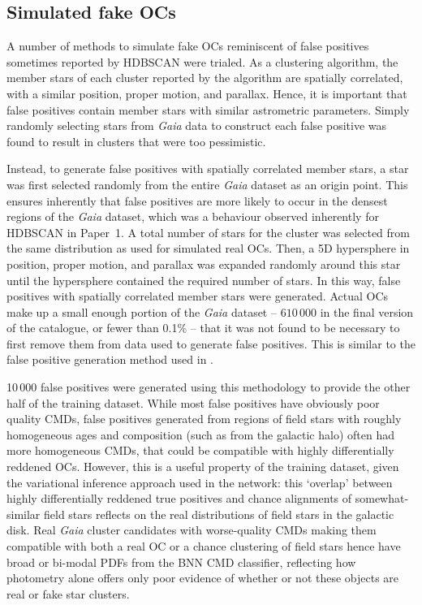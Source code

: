 \subsection{Simulated fake OCs}\label{c3:sec:cmd_classifier:fps}

A number of methods to simulate fake OCs reminiscent of false positives sometimes reported by HDBSCAN were trialed. As a clustering algorithm, the member stars of each cluster reported by the algorithm are spatially correlated, with a similar position, proper motion, and parallax. Hence, it is important that false positives contain member stars with similar astrometric parameters. Simply randomly selecting stars from \emph{Gaia} data to construct each false positive was found to result in clusters that were too pessimistic.

Instead, to generate false positives with spatially correlated member stars, a star was first selected randomly from the entire \emph{Gaia} dataset as an origin point. This ensures inherently that false positives are more likely to occur in the densest regions of the \emph{Gaia} dataset, which was a behaviour observed inherently for HDBSCAN in Paper~1. A total number of stars for the cluster was selected from the same distribution as used for simulated real OCs. Then, a 5D hypersphere in position, proper motion, and parallax was expanded randomly around this star until the hypersphere contained the required number of stars. In this way, false positives with spatially correlated member stars were generated. Actual OCs make up a small enough portion of the \emph{Gaia} dataset -- $610 \, 000$ in the final version of the catalogue, or fewer than 0.1\% -- that it was not found to be necessary to first remove them from data used to generate false positives. This is similar to the false positive generation method used in \cite{castro-ginard_hunting_2022}.

10\,000 false positives were generated using this methodology to provide the other half of the training dataset. While most false positives have obviously poor quality CMDs, false positives generated from regions of field stars with roughly homogeneous ages and composition (such as from the galactic halo) often had more homogeneous CMDs, that could be compatible with highly differentially reddened OCs. However, this is a useful property of the training dataset, given the variational inference approach used in the network: this `overlap' between highly differentially reddened true positives and chance alignments of somewhat-similar field stars reflects on the real distributions of field stars in the galactic disk. Real \emph{Gaia} cluster candidates with worse-quality CMDs making them compatible with both a real OC or a chance clustering of field stars hence have broad or bi-modal PDFs from the BNN CMD classifier, reflecting how photometry alone offers only poor evidence of whether or not these objects are real or fake star clusters.

